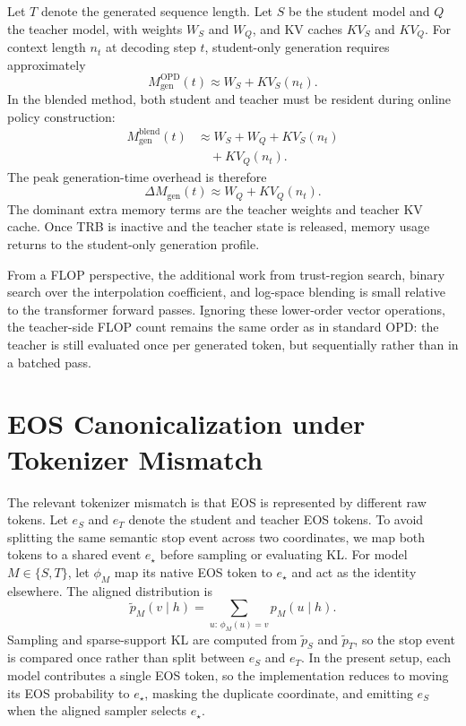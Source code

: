 \documentclass{llmxive}
\begin{document}
Let $T$ denote the generated sequence length.
Let $S$ be the student model and $Q$ the teacher model, with weights $W_S$ and $W_Q$, and KV caches $KV_S$ and $KV_Q$.
For context length $n_t$ at decoding step $t$, student-only generation requires approximately
\begin{equation}
M_{\mathrm{gen}}^{\mathrm{OPD}}(t)
\approx
W_S + KV_S(n_t).
\end{equation}
In the blended method, both student and teacher must be resident during online policy construction:
\begin{equation}
\begin{aligned}
M_{\mathrm{gen}}^{\mathrm{blend}}(t)
&\approx
W_S + W_Q + KV_S(n_t)
\\
&\quad + KV_Q(n_t).
\end{aligned}
\end{equation}
The peak generation-time overhead is therefore
\begin{equation}
\Delta M_{\mathrm{gen}}(t)
\approx
W_Q + KV_Q(n_t).
\end{equation}
The dominant extra memory terms are the teacher weights and teacher KV cache.
Once TRB is inactive and the teacher state is released, memory usage returns to the student-only generation profile.

From a FLOP perspective, the additional work from trust-region search, binary search over the interpolation coefficient, and log-space blending is small relative to the transformer forward passes.
Ignoring these lower-order vector operations, the teacher-side FLOP count remains the same order as in standard OPD: the teacher is still evaluated once per generated token, but sequentially rather than in a batched pass.

\section{EOS Canonicalization under Tokenizer Mismatch}
\label{app:eos}

The relevant tokenizer mismatch is that EOS is represented by different raw tokens.
Let $e_S$ and $e_T$ denote the student and teacher EOS tokens.
To avoid splitting the same semantic stop event across two coordinates, we map both tokens to a shared event $e_\star$ before sampling or evaluating KL.
For model $M\in\{S,T\}$, let $\phi_M$ map its native EOS token to $e_\star$ and act as the identity elsewhere.
The aligned distribution is
\begin{equation}
\tilde p_M(v \mid h)
=
\sum_{u:\,\phi_M(u)=v} p_M(u \mid h).
\end{equation}
Sampling and sparse-support KL are computed from $\tilde p_S$ and $\tilde p_T$, so the stop event is compared once rather than split between $e_S$ and $e_T$.
In the present setup, each model contributes a single EOS token, so the implementation reduces to moving its EOS probability to $e_\star$, masking the duplicate coordinate, and emitting $e_S$ when the aligned sampler selects $e_\star$.
\end{document}
